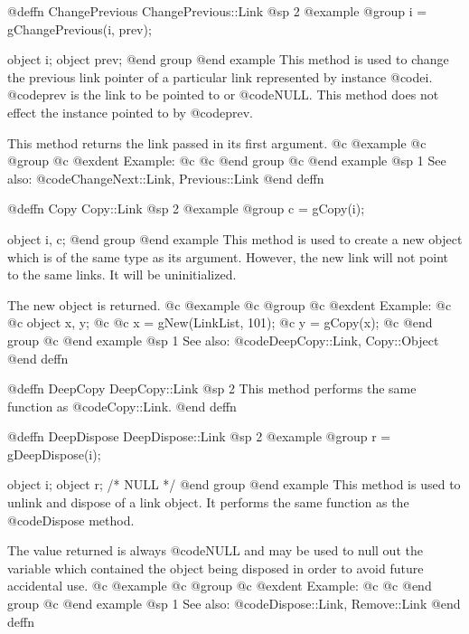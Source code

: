 @deffn {ChangePrevious} ChangePrevious::Link
@sp 2
@example
@group
i = gChangePrevious(i, prev);

object  i;
object  prev;
@end group
@end example
This method is used to change the previous link pointer of a particular
link represented by instance @code{i}.  @code{prev} is the link to be
pointed to or @code{NULL}.  This method does not effect the instance
pointed to by @code{prev}.

This method returns the link passed in its first argument.
@c @example
@c @group
@c @exdent Example:
@c 
@c @end group
@c @end example
@sp 1
See also:  @code{ChangeNext::Link, Previous::Link}
@end deffn







@deffn {Copy} Copy::Link
@sp 2
@example
@group
c = gCopy(i);

object  i, c;
@end group
@end example
This method is used to create a new object which is of the same type as
its argument.  However, the new link will not point to the same links.
It will be uninitialized.

The new object is returned.
@c @example
@c @group
@c @exdent Example:
@c 
@c object  x, y;
@c 
@c x = gNew(LinkList, 101);
@c y = gCopy(x);
@c @end group
@c @end example
@sp 1
See also:  @code{DeepCopy::Link, Copy::Object}
@end deffn










@deffn {DeepCopy} DeepCopy::Link
@sp 2
This method performs the same function as @code{Copy::Link}.
@end deffn











@deffn {DeepDispose} DeepDispose::Link
@sp 2
@example
@group
r = gDeepDispose(i);

object  i;
object  r;     /*  NULL  */
@end group
@end example
This method is used to unlink and dispose of a link object.
It performs the same function as the @code{Dispose} method.

The value returned is always @code{NULL} and may be used to null out
the variable which contained the object being disposed in order to
avoid future accidental use.
@c @example
@c @group
@c @exdent Example:
@c 
@c @end group
@c @end example
@sp 1
See also:  @code{Dispose::Link, Remove::Link}
@end deffn










